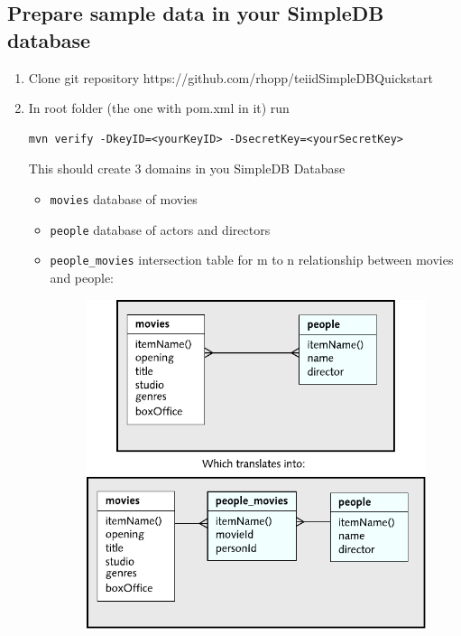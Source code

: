 \documentclass[oneside,12pt]{fithesis2}
\begin{document}
\subsection*{Prepare sample data in your SimpleDB database}
\begin{enumerate}
 \item Clone git repository https://github.com/rhopp/teiidSimpleDBQuickstart
 \item In root folder (the one with pom.xml in it) run
 \begin{Verbatim}[fontsize=\small]
mvn verify -DkeyID=<yourKeyID> -DsecretKey=<yourSecretKey>
 \end{Verbatim}
 This should create 3 domains in you SimpleDB Database
 \begin{itemize}
  \item \texttt{movies} database of movies
  \item \texttt{people} database of actors and directors
  \item \texttt{people\_movies} intersection table for m to n relationship between movies and people:
  \begin{figure}[h]
 \centering
 \includegraphics[scale=1]{exampleStructure}
\end{figure}
 \end{itemize}
 

\end{enumerate}
\end{document}
